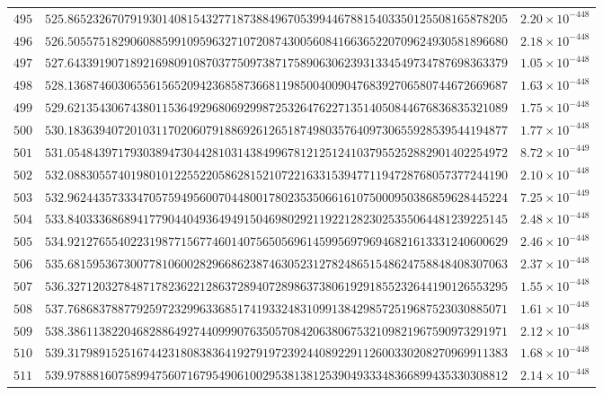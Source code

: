 \documentclass[12pt,reqno]{amsart}
\theoremstyle{remark}
\begin{document}
\begin{longtable}{clc}
$495$ & $525.8652326707919301408154327718738849670539944678815403350125508165878205$ & $2.20\times 10^{-448}$ \\
$496$ & $526.5055751829060885991095963271072087430056084166365220709624930581896680$ & $2.18\times 10^{-448}$ \\
$497$ & $527.6433919071892169809108703775097387175890630623931334549734787698363379$ & $1.05\times 10^{-448}$ \\
$498$ & $528.1368746030655615652094236858736681198500400904768392706580744672669687$ & $1.63\times 10^{-448}$ \\
$499$ & $529.6213543067438011536492968069299872532647622713514050844676836835321089$ & $1.75\times 10^{-448}$ \\
$500$ & $530.1836394072010311702060791886926126518749803576409730655928539544194877$ & $1.77\times 10^{-448}$ \\
$501$ & $531.0548439717930389473044281031438499678121251241037955252882901402254972$ & $8.72\times 10^{-449}$ \\
$502$ & $532.0883055740198010122552205862815210722163315394771194728768057377244190$ & $2.10\times 10^{-448}$ \\
$503$ & $532.9624435733347057594956007044800178023535066161075000950386859628445224$ & $7.25\times 10^{-449}$ \\
$504$ & $533.8403336868941779044049364949150469802921192212823025355064481239225145$ & $2.48\times 10^{-448}$ \\
$505$ & $534.9212765540223198771567746014075650569614599569796946821613331240600629$ & $2.46\times 10^{-448}$ \\
$506$ & $535.6815953673007781060028296686238746305231278248651548624758848408307063$ & $2.37\times 10^{-448}$ \\
$507$ & $536.3271203278487178236221286372894072898637380619291855232644190126553295$ & $1.55\times 10^{-448}$ \\
$508$ & $537.7686837887792597232996336851741933248310991384298572519687523030885071$ & $1.61\times 10^{-448}$ \\
$509$ & $538.3861138220468288649274409990763505708420638067532109821967590973291971$ & $2.12\times 10^{-448}$ \\
$510$ & $539.3179891525167442318083836419279197239244089229112600330208270969911383$ & $1.68\times 10^{-448}$ \\
$511$ & $539.9788816075899475607167954906100295381381253904933348366899435330308812$ & $2.14\times 10^{-448}$ \\

\end{longtable}
\end{document}
